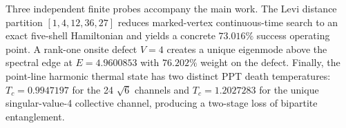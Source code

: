Three independent finite probes accompany the main work. The Levi distance partition $[1,4,12,36,27]$ reduces marked-vertex continuous-time search to an exact five-shell Hamiltonian and yields a concrete $73.016\%$ success operating point. A rank-one onsite defect $V=4$ creates a unique eigenmode above the spectral edge at $E=4.9600853$ with $76.202\%$ weight on the defect. Finally, the point-line harmonic thermal state has two distinct PPT death temperatures: $T_c=0.9947197$ for the 24 $\sqrt6$ channels and $T_c=1.2027283$ for the unique singular-value-4 collective channel, producing a two-stage loss of bipartite entanglement.
